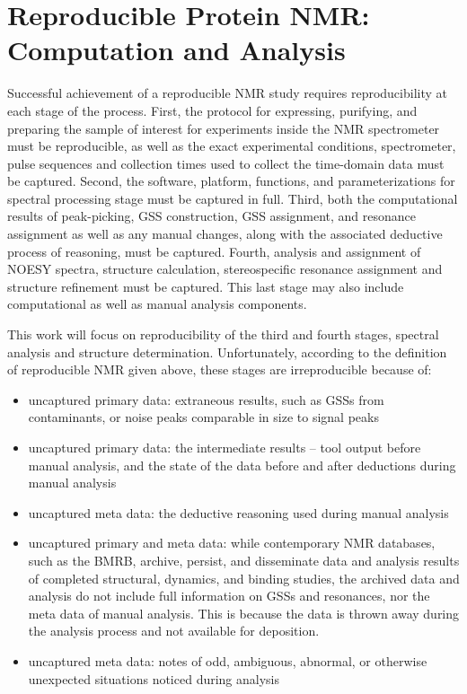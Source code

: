 \section{Reproducible Protein NMR:  Computation and Analysis}
Successful achievement of a reproducible NMR study requires reproducibility at 
each stage of the process.  First, the protocol for expressing, purifying, and 
preparing the sample of interest for experiments inside the NMR spectrometer 
must be reproducible, as well as the exact experimental conditions, 
spectrometer, pulse sequences and collection times used to collect the 
time-domain data must be captured.  Second, the software, platform, functions, 
and parameterizations for spectral processing stage must be captured in full.  
Third, both the computational results of peak-picking, GSS construction,
GSS assignment, and resonance assignment as well as any manual changes, 
along with the associated deductive process of reasoning, must be captured.  
Fourth, analysis and assignment of NOESY spectra, structure calculation, 
stereospecific resonance assignment and structure refinement must be captured.  
This last stage may also include computational as well as manual analysis 
components.  

This work will focus on reproducibility of the third and fourth stages, 
spectral analysis and structure determination.  Unfortunately, according to 
the definition of reproducible NMR given above, these stages are irreproducible 
because of:
\begin{itemize}
  \item uncaptured primary data: extraneous results, such as GSSs from 
  contaminants, or noise peaks comparable in size to signal peaks
  \item uncaptured primary data: the intermediate results -- tool output before 
  manual analysis, and the state of the data before and after deductions during 
  manual analysis
  \item uncaptured meta data:  the deductive reasoning used during manual analysis
  \item uncaptured primary and meta data: while contemporary NMR databases, 
  such as the BMRB, archive, persist, and disseminate data and analysis 
  results of completed structural, dynamics, and binding studies, the 
  archived data and analysis do not include full information on GSSs 
  and resonances, nor the meta data of manual analysis.  This is because the 
  data is thrown away during the analysis process and not available for deposition.
  \item uncaptured meta data: notes of odd, ambiguous, abnormal, or 
  otherwise unexpected situations noticed during analysis
\end{itemize}


